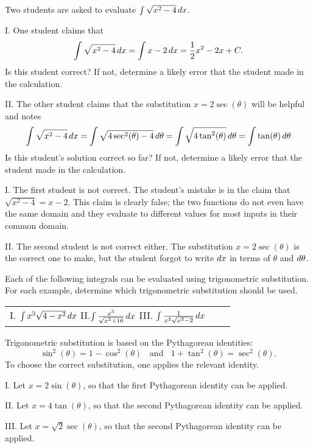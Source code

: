 \documentclass[noauthor]{ximera}
\begin{document}
\begin{problem}
Two students are asked to evaluate $\int \sqrt{x^2-4} \mathop{}\!d x$.

\item[I.] One student claims that
\[
\int \sqrt{x^2-4} \mathop{}\!d x = \int x-2 \mathop{}\!d x = \frac{1}{2}x^2 - 2x + C.
\]
Is this student correct? If not, determine a likely error that the student made in the calculation.

\item[II.] The other student claims that the substitution $x = 2 \sec(\theta)$ will be helpful and notes
\[
\int \sqrt{x^2-4} \mathop{}\!d x =\int \sqrt{4 \sec^2(\theta)-4} \mathop{}\!d \theta = \int \sqrt{4 \tan^2(\theta)} \mathop{}\!d \theta =  \int \tan(\theta) \mathop{}\!d \theta
\]
Is this student's solution correct so far? If not, determine a likely error that the student made in the calculation.
\end{problem}

\begin{freeResponse}
I. The first student is not correct. The student's mistake is in the claim that $\sqrt{x^2-4}=x-2$. This claim is clearly false; the two functions do not even have the same domain and they evaluate to different values for most inputs in their common domain.

II. The second student is not correct either.  The substitution $x = 2\sec(\theta)$ is the correct one to make, but the student forgot to write $\mathop{}\!d x$ in terms of $\theta$ and $\mathop{}\!d \theta$.

\end{freeResponse}

\begin{problem}
Each of the following integrals can be evaluated using trigonometric substitution. For each example, determine which trigonometric substitution should be used.

\begin{center}
\begin{tabular}{lll}
I. $\int x^3 \sqrt{4-x^2} \mathop{}\!d x $ \hspace{.2in} II.$\int \frac{x^3}{\sqrt{x^2+16}} \mathop{}\!d x$ \hspace{.2in} III. $\int \frac{1}{x^2 \sqrt{x^2-2}} \mathop{}\!d x$
\end{tabular}
\end{center}
\end{problem}

\begin{freeResponse}
Trigonometric substitution is based on the Pythagorean identities:
$$
\sin^2(\theta)  = 1 - \cos^2(\theta) \;\; \mbox{ and } \;\;  1 + \tan^2(\theta) = \sec^2(\theta).
$$
To choose the correct substitution, one applies the relevant identity.

I. Let $x = 2 \sin(\theta)$, so that the first Pythagorean identity can be applied.

II. Let $x=4 \tan(\theta)$, so that the second Pythagorean identity can be applied.

III. Let $x=\sqrt{2}\sec(\theta)$, so that the second Pythagorean identity can be applied.
\end{freeResponse}
\end{document}
